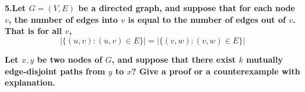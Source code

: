 
\chapter{}
\textbf{
5.Let $G=(V,E)$ be a directed graph, and suppose that for each node $v$, the number of edges into $v$ is equal to the number of edges out of $v$. That is for all $v$,
$$|\{(u,v):(u,v)\in E\}|=|\{(v,w):(v,w)\in E\}|$$
}

\textbf{
Let $x,y$ be two nodes of $G$, and suppose that there exist $k$ mutually edge-disjoint paths from $y$ to $x$? Give a proof or a counterexample with explanation.
}


